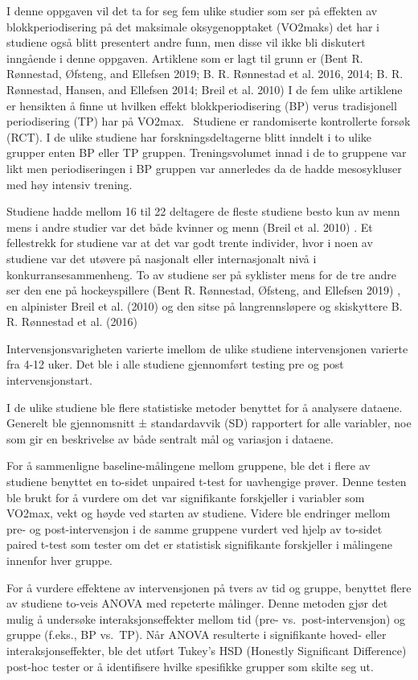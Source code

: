 \documentclass[
  letterpaper,
  DIV=11,
  numbers=noendperiod]{scrreprt}
\begin{document}
I denne oppgaven vil det ta for seg fem ulike studier som ser på
effekten av blokkperiodisering på det maksimale oksygenopptaket
(VO2maks) det har i studiene også blitt presentert andre funn, men disse
vil ikke bli diskutert inngående i denne oppgaven. Artiklene som er lagt
til grunn er (Bent R. Rønnestad, Øfsteng, and Ellefsen 2019; B. R.
Rønnestad et al. 2016, 2014; B. R. Rønnestad, Hansen, and Ellefsen 2014;
Breil et al. 2010) I de fem ulike artiklene er hensikten å finne ut
hvilken effekt blokkperiodisering (BP) verus tradisjonell periodisering
(TP) har på VO2max.~ Studiene er randomiserte kontrollerte forsøk (RCT).
I de ulike studiene har forskningsdeltagerne blitt inndelt i to ulike
grupper enten BP eller TP gruppen. Treningsvolumet innad i de to
gruppene var likt men periodiseringen i BP gruppen var annerledes da de
hadde mesosykluser med høy intensiv trening.

Studiene hadde mellom 16 til 22 deltagere de fleste studiene besto kun
av menn mens i andre studier var det både kvinner og menn (Breil et al.
2010) . Et fellestrekk for studiene var at det var godt trente
individer, hvor i noen av studiene var det utøvere på nasjonalt eller
internasjonalt nivå i konkurransesammenheng. To av studiene ser på
syklister mens for de tre andre ser den ene på hockeyspillere (Bent R.
Rønnestad, Øfsteng, and Ellefsen 2019) , en alpinister Breil et al.
(2010) og den sitse på langrennsløpere og skiskyttere B. R. Rønnestad et
al. (2016)

Intervensjonsvarigheten varierte imellom de ulike studiene
intervensjonen varierte fra 4-12 uker. Det ble i alle studiene
gjennomført testing pre og post intervensjonstart.

I de ulike studiene ble flere statistiske metoder benyttet for å
analysere dataene. Generelt ble gjennomsnitt ± standardavvik (SD)
rapportert for alle variabler, noe som gir en beskrivelse av både
sentralt mål og variasjon i dataene.

For å sammenligne baseline-målingene mellom gruppene, ble det i flere av
studiene benyttet en to-sidet unpaired t-test for uavhengige prøver.
Denne testen ble brukt for å vurdere om det var signifikante forskjeller
i variabler som VO2max, vekt og høyde ved starten av studiene. Videre
ble endringer mellom pre- og post-intervensjon i de samme gruppene
vurdert ved hjelp av to-sidet paired t-test som tester om det er
statistisk signifikante forskjeller i målingene innenfor hver gruppe.

For å vurdere effektene av intervensjonen på tvers av tid og gruppe,
benyttet flere av studiene to-veis ANOVA med repeterte målinger. Denne
metoden gjør det mulig å undersøke interaksjonseffekter mellom tid (pre-
vs.~post-intervensjon) og gruppe (f.eks., BP vs.~TP). Når ANOVA
resulterte i signifikante hoved- eller interaksjonseffekter, ble det
utført Tukey's HSD (Honestly Significant Difference) post-hoc tester or
å identifisere hvilke spesifikke grupper som skilte seg ut.
\end{document}
